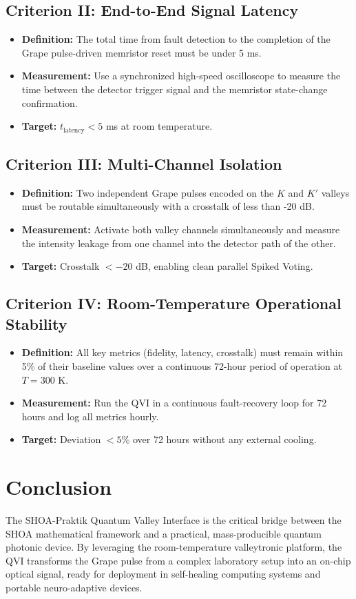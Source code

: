 \documentclass[12pt]{article}
\begin{document}
\subsection{Criterion II: End-to-End Signal Latency}
\begin{itemize}
    \item \textbf{Definition:} The total time from fault detection to the completion of the Grape pulse-driven memristor reset must be under 5 ms.
    \item \textbf{Measurement:} Use a synchronized high-speed oscilloscope to measure the time between the detector trigger signal and the memristor state-change confirmation.
    \item \textbf{Target:} $t_{\text{latency}} < 5$ ms at room temperature.
\end{itemize}

\subsection{Criterion III: Multi-Channel Isolation}
\begin{itemize}
    \item \textbf{Definition:} Two independent Grape pulses encoded on the $K$ and $K'$ valleys must be routable simultaneously with a crosstalk of less than -20 dB.
    \item \textbf{Measurement:} Activate both valley channels simultaneously and measure the intensity leakage from one channel into the detector path of the other.
    \item \textbf{Target:} Crosstalk $< -20$ dB, enabling clean parallel Spiked Voting.
\end{itemize}

\subsection{Criterion IV: Room-Temperature Operational Stability}
\begin{itemize}
    \item \textbf{Definition:} All key metrics (fidelity, latency, crosstalk) must remain within 5\% of their baseline values over a continuous 72-hour period of operation at $T=300$ K.
    \item \textbf{Measurement:} Run the QVI in a continuous fault-recovery loop for 72 hours and log all metrics hourly.
    \item \textbf{Target:} Deviation $< 5\%$ over 72 hours without any external cooling.
\end{itemize}

\section{Conclusion}
The SHOA-Praktik Quantum Valley Interface is the critical bridge between the SHOA mathematical framework and a practical, mass-producible quantum photonic device. By leveraging the room-temperature valleytronic platform, the QVI transforms the Grape pulse from a complex laboratory setup into an on-chip optical signal, ready for deployment in self-healing computing systems and portable neuro-adaptive devices.
\end{document}
